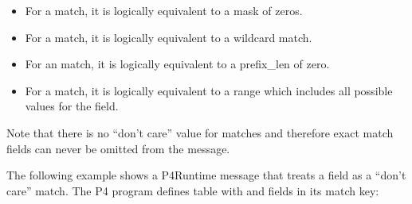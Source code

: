 \documentclass[11pt]{article}
\begin{document}
{%
\begin{itemize}%

\item{}
For a  match, it is logically equivalent to a mask of zeros.%

\item{}
For a  match, it is logically equivalent to a wildcard match.%

\item{}
For an  match, it is logically equivalent to a prefix\_len of zero.%

\item{}
For a  match, it is logically equivalent to a range which includes all
possible values for the field.%
\end{itemize}%

\noindent{}Note that there is no \textquotedblleft{}don't care\textquotedblright{} value for  matches and therefore exact
match fields can never be omitted from the  message.%

The following example shows a P4Runtime message that treats a  field
as a \textquotedblleft{}don't care\textquotedblright{} match. The P4 program defines table  with 
and  fields in its match key:%

}
\end{document}
